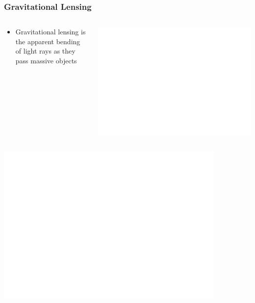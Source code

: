 \documentclass{beamer}
\begin{document}
\frame
{

    \frametitle{Gravitational Lensing}


    \begin{columns}
        \begin{column}{0.5\textwidth}
            \begin{itemize}

                \item Gravitational lensing is the apparent bending of light
                    rays as they pass massive objects


            \end{itemize}
        \end{column}
        \begin{column}{0.5\textwidth}
            \begin{center}
                \includegraphics[width=\textwidth]{lens_geometry_invert.pdf}
            \end{center}

            
        \end{column}
    \end{columns}


}

\frame
{
            \begin{center}
                \includegraphics[width=0.85\textwidth]{lens_geometry_invert.pdf}
            \end{center}
}
\end{document}
